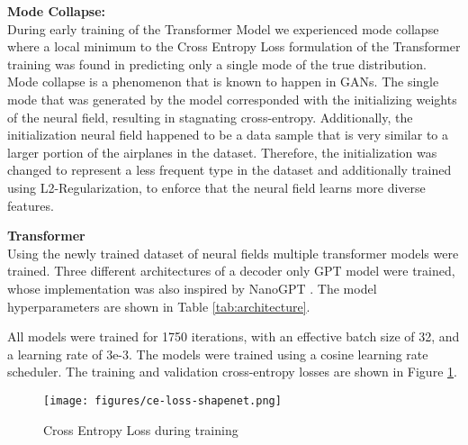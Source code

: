 \noindent
\textbf{Mode Collapse: }\\
During early training of the Transformer Model we experienced mode collapse where a local minimum to the Cross Entropy Loss formulation of the Transformer training was found in predicting only a single mode of the true distribution. Mode collapse is a phenomenon that is known to happen in GANs. The single mode that was generated by the model corresponded with the initializing weights of the neural field, resulting in stagnating cross-entropy. Additionally, the initialization neural field happened to be a data sample that is very similar to a larger portion of the airplanes in the dataset. Therefore, the initialization was changed to represent a less frequent type in the dataset and additionally trained using L2-Regularization, to enforce that the neural field learns more diverse features.
\vspace{1em}

\noindent
\textbf{Transformer}\\
Using the newly trained dataset of neural fields multiple transformer models were trained. Three different architectures of a decoder only GPT model were trained, whose implementation was also inspired by NanoGPT \cite{Karpathy2022}. The model hyperparameters are shown in Table \ref{tab:architecture}.



All models were trained for 1750 iterations, with an effective batch size of 32, and a learning rate of 3e-3. The models were trained using a cosine learning rate scheduler. The training and validation cross-entropy losses are shown in Figure \ref{fig:loss}.


\begin{figure}[!htbp]
  \centering
  \texttt{[image: figures/ce-loss-shapenet.png]}
  \caption{Cross Entropy Loss during training}
  \label{fig:loss}
\end{figure}


